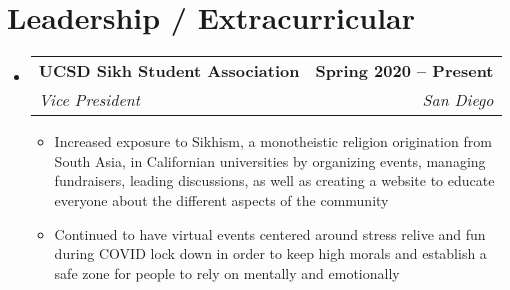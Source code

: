 \documentclass[letterpaper,11pt]{article}
\makeatletter
\newcommand{\resumeItem}[1]{
  \item\small{
    {#1 \vspace{-2pt}}
  }
}
\newcommand{\resumeSubheading}[4]{
  \vspace{-2pt}\item
    \begin{tabular*}{1.0\textwidth}[t]{l@{\extracolsep{\fill}}r}
      \textbf{#1} & \textbf{\small #2} \\
      \textit{\small#3} & \textit{\small #4} \\
    \end{tabular*}\vspace{-7pt}
}
\newcommand{\resumeSubHeadingListStart}{\begin{itemize}[leftmargin=0.0in, label={}]}
\newcommand{\resumeSubHeadingListEnd}{\end{itemize}}
\newcommand{\resumeItemListStart}{\begin{itemize}}
\newcommand{\resumeItemListEnd}{\end{itemize}\vspace{-5pt}}
\makeatother
\begin{document}
\section{Leadership / Extracurricular}
    \resumeSubHeadingListStart
        \resumeSubheading{UCSD Sikh Student Association}{Spring 2020 -- Present}{Vice President}{San Diego}
            \resumeItemListStart
            
                \resumeItem{Increased exposure to Sikhism, a monotheistic religion origination from South Asia, in Californian universities by organizing events, managing fundraisers, leading discussions, as well as creating a website to educate everyone about the different aspects of the community}
                 \resumeItem{ Continued to have virtual events centered around stress relive and fun during COVID lock down in order to keep high morals and establish a safe zone for people to rely on mentally and emotionally}
            \resumeItemListEnd
        
    \resumeSubHeadingListEnd
\end{document}
